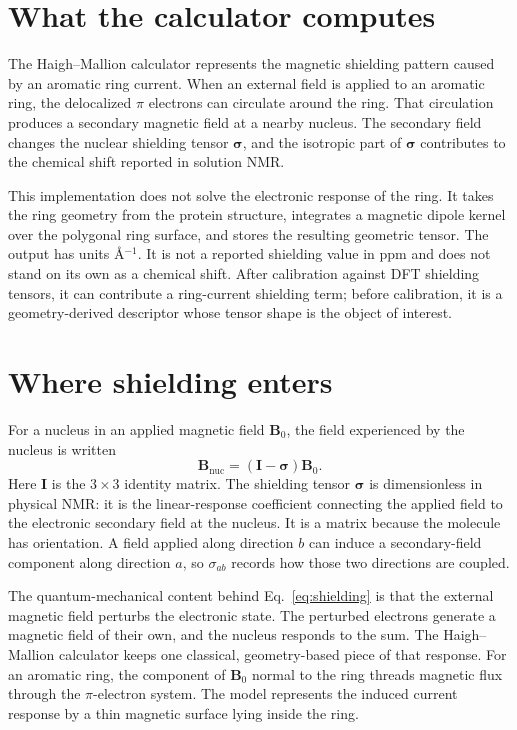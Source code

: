 \documentclass[11pt]{article}
\begin{document}

\section{What the calculator computes}

The Haigh--Mallion calculator represents the magnetic shielding pattern caused
by an aromatic ring current. When an external field is applied to an aromatic
ring, the delocalized \(\pi\) electrons can circulate around the ring. That
circulation produces a secondary magnetic field at a nearby nucleus. The
secondary field changes the nuclear shielding tensor \(\bm\sigma\), and the
isotropic part of \(\bm\sigma\) contributes to the chemical shift reported in
solution NMR.

This implementation does not solve the electronic response of the ring. It
takes the ring geometry from the protein structure, integrates a magnetic
dipole kernel over the polygonal ring surface, and stores the resulting
geometric tensor. The output has units \(\si{\angstrom^{-1}}\). It is not a
reported shielding value in ppm and does not stand on its own as a chemical
shift. After calibration against DFT shielding tensors, it can contribute a
ring-current shielding term; before calibration, it is a geometry-derived
descriptor whose tensor shape is the object of interest.

\section{Where shielding enters}

For a nucleus in an applied magnetic field \(\bm B_0\), the field experienced
by the nucleus is written
\begin{equation}
  \bm B_{\mathrm{nuc}}=(\bm I-\bm\sigma)\bm B_0 .
  \label{eq:shielding}
\end{equation}
Here \(\bm I\) is the \(3\times3\) identity matrix. The shielding tensor
\(\bm\sigma\) is dimensionless in physical NMR: it is the linear-response
coefficient connecting the applied field to the electronic secondary field at
the nucleus. It is a matrix because the molecule has orientation. A field
applied along direction \(b\) can induce a secondary-field component along
direction \(a\), so \(\sigma_{ab}\) records how those two directions are
coupled.

The quantum-mechanical content behind Eq.~\eqref{eq:shielding} is that the
external magnetic field perturbs the electronic state. The perturbed electrons
generate a magnetic field of their own, and the nucleus responds to the sum.
The Haigh--Mallion calculator keeps one classical, geometry-based piece of that
response. For an aromatic ring, the component of \(\bm B_0\) normal to the ring
threads magnetic flux through the \(\pi\)-electron system. The model represents
the induced current response by a thin magnetic surface lying inside the ring.
\end{document}
